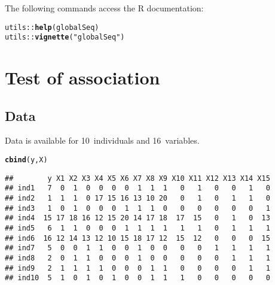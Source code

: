 \documentclass{article}\usepackage[]{graphicx}\usepackage[]{color}
\makeatletter
\newcommand{\hlstr}[1]{\textcolor[rgb]{0.192,0.494,0.8}{#1}}%
\newcommand{\hlopt}[1]{\textcolor[rgb]{0,0,0}{#1}}%
\newcommand{\hlstd}[1]{\textcolor[rgb]{0.345,0.345,0.345}{#1}}%
\newcommand{\hlkwd}[1]{\textcolor[rgb]{0.737,0.353,0.396}{\textbf{#1}}}%
\newenvironment{kframe}{%
 \def\at@end@of@kframe{}%
 \ifinner\ifhmode%
  \def\at@end@of@kframe{\end{minipage}}%
  \begin{minipage}{\columnwidth}%
 \fi\fi%
 \def\FrameCommand##1{\hskip\@totalleftmargin \hskip-\fboxsep
 \colorbox{shadecolor}{##1}\hskip-\fboxsep
     \hskip-\linewidth \hskip-\@totalleftmargin \hskip\columnwidth}%
 \MakeFramed {\advance\hsize-\width
   \@totalleftmargin\z@ \linewidth\hsize
   \@setminipage}}%
 {\par\unskip\endMakeFramed%
 \at@end@of@kframe}
\newenvironment{knitrout}{}{} %
\makeatother
\begin{document}


The following commands access the R documentation:
\begin{knitrout}
\color{fgcolor}\begin{kframe}
\begin{alltt}
\hlstd{utils}\hlopt{::}\hlkwd{help}\hlstd{(globalSeq)}
\hlstd{utils}\hlopt{::}\hlkwd{vignette}\hlstd{(}\hlstr{"globalSeq"}\hlstd{)}
\end{alltt}
\end{kframe}
\end{knitrout}

\newpage %
\section{Test of association} %
\label{omnibus} %

\subsection{Data}
\label{omnibus_data}

Data is available for 10~individuals and 16~variables.

\begin{knitrout}
\color{fgcolor}\begin{kframe}
\begin{alltt}
\hlkwd{cbind}\hlstd{(y,X)}
\end{alltt}
\begin{verbatim}
##        y X1 X2 X3 X4 X5 X6 X7 X8 X9 X10 X11 X12 X13 X14 X15
## ind1   7  0  1  0  0  0  0  1  1  1   0   1   0   0   1   0
## ind2   1  1  1  0 17 15 16 13 10 20   0   1   0   1   1   0
## ind3   1  0  1  0  0  0  1  1  1  0   0   0   0   0   0   1
## ind4  15 17 18 16 12 15 20 14 17 18  17  15   0   1   0  13
## ind5   6  1  1  0  0  0  1  1  1  1   1   1   0   1   1   1
## ind6  16 12 14 13 12 10 15 18 17 12  15  12   0   0   0  15
## ind7   5  0  0  1  1  0  0  1  0  0   0   0   1   1   1   1
## ind8   2  0  1  1  0  0  0  1  0  0   0   0   0   1   1   1
## ind9   2  1  1  1  1  0  0  0  1  1   0   0   0   0   1   1
## ind10  5  1  0  1  0  1  0  0  1  1   1   0   0   0   0   0
\end{verbatim}
\end{kframe}
\end{knitrout}
\end{document}
